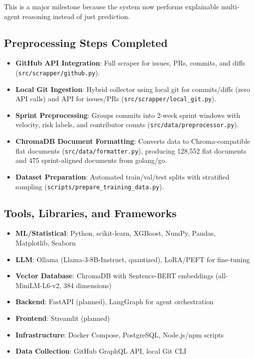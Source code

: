 \documentclass[journal]{IEEEtran}
\begin{document}
This is a major milestone because the system now performs explainable multi-agent reasoning instead of just prediction.

\subsection{Preprocessing Steps Completed}

\begin{itemize}
    \item \textbf{GitHub API Integration}: Full scraper for issues, PRs, commits, and diffs (\texttt{src/scrapper/github.py}).
    \item \textbf{Local Git Ingestion}: Hybrid collector using local git for commits/diffs (zero API calls) and API for issues/PRs (\texttt{src/scrapper/local\_git.py}).
    \item \textbf{Sprint Preprocessing}: Groups commits into 2-week sprint windows with velocity, risk labels, and contributor counts (\texttt{src/data/preprocessor.py}).
    \item \textbf{ChromaDB Document Formatting}: Converts data to Chroma-compatible flat documents (\texttt{src/data/formatter.py}), producing 128,552 flat documents and 475 sprint-aligned documents from golang/go.
    \item \textbf{Dataset Preparation}: Automated train/val/test splits with stratified sampling (\texttt{scripts/prepare\_training\_data.py}).
\end{itemize}

\subsection{Tools, Libraries, and Frameworks}

\begin{itemize}
    \item \textbf{ML/Statistical}: Python, scikit-learn, XGBoost, NumPy, Pandas, Matplotlib, Seaborn
    \item \textbf{LLM}: Ollama (Llama-3-8B-Instruct, quantized), LoRA/PEFT for fine-tuning
    \item \textbf{Vector Database}: ChromaDB with Sentence-BERT embeddings (all-MiniLM-L6-v2, 384 dimensions)
    \item \textbf{Backend}: FastAPI (planned), LangGraph for agent orchestration
    \item \textbf{Frontend}: Streamlit (planned)
    \item \textbf{Infrastructure}: Docker Compose, PostgreSQL, Node.js/npm scripts
    \item \textbf{Data Collection}: GitHub GraphQL API, local Git CLI
\end{itemize}
\end{document}

